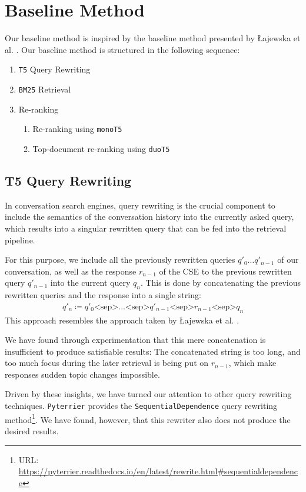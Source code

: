 \documentclass[sigconf]{acmart}
\begin{document}
\section{Baseline Method}\label{sec:baseline}
Our baseline method is inspired by the baseline method presented by Łajewska et al. \cite{Lajewska:2023:ECIR}. Our baseline method is structured in the following sequence:
\begin{enumerate}
	\item	\texttt{T5} Query Rewriting
	\item	\texttt{BM25} Retrieval
	\item	Re-ranking
			\begin{enumerate}
				\item	Re-ranking using \texttt{monoT5}
				\item	Top-document re-ranking using \texttt{duoT5}
			\end{enumerate}
\end{enumerate}

\subsection{T5 Query Rewriting}
In conversation search engines, query rewriting is the crucial component to include the semantics of the conversation history into the currently asked query, which results into a singular rewritten query that can be fed into the retrieval pipeline.

For this purpose, we include all the previously rewritten queries $q'_0 \dots q'_{n-1}$ of our conversation, as well as the response $r_{n-1}$ of the CSE to the previous rewritten query $q'_{n-1}$ into the current query $q_n$. This is done by concatenating the previous rewritten queries and the response into a single string:
\begin{align*}
	q'_n \coloneqq q'_0 \text{<sep>} \dots \text{<sep>} q'_{n-1} \text{<sep>} r_{n-1} \text{<sep>} q_n
\end{align*}
This approach resembles the approach taken by Łajewska et al. \cite{Lajewska:2023:ECIR}.

We have found through experimentation that this mere concatenation is insufficient to produce satisfiable results: The concatenated string is too long, and too much focus during the later retrieval is being put on $r_{n-1}$, which make responses sudden topic changes impossible.

Driven by these insights, we have turned our attention to other query rewriting techniques. \texttt{Pyterrier} provides the \texttt{SequentialDependence} query rewriting method\footnote{URL: \url{https://pyterrier.readthedocs.io/en/latest/rewrite.html\#sequentialdependence}}. We have found, however, that this rewriter also does not produce the desired results.
\end{document}
